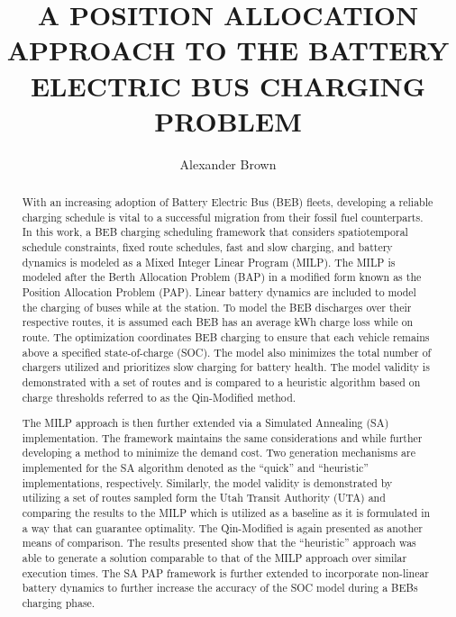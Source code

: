 \documentclass[ee,thesis]{usuthesis}
\author{Alexander Brown}
\date{}
\title{A POSITION ALLOCATION APPROACH TO THE BATTERY ELECTRIC BUS CHARGING PROBLEM}
\begin{document}
\newtheorem*{lemma}{Lemma}

\let\ref\autoref                            %

\preliminaries   %

\maketitle

\tableofcontents
\listoftables
\listoffigures

\begin{abstract}

With an increasing adoption of Battery Electric Bus (BEB) fleets, developing a reliable charging schedule is vital to a successful migration from their fossil fuel counterparts. In this work, a BEB charging scheduling framework that considers spatiotemporal schedule constraints, fixed route schedules, fast and slow charging, and battery dynamics is modeled as a Mixed Integer Linear Program (MILP). The MILP is modeled after the Berth Allocation Problem (BAP) in a modified form known as the Position Allocation Problem (PAP). Linear battery dynamics are included to model the charging of buses while at the station. To model the BEB discharges over their respective routes, it is assumed each BEB has an average kWh charge loss while on route. The optimization coordinates BEB charging to ensure that each vehicle remains above a specified state-of-charge (SOC). The model also minimizes the total number of chargers utilized and prioritizes slow charging for battery health. The model validity is demonstrated with a set of routes and is compared to a heuristic algorithm based on charge thresholds referred to as the Qin-Modified method.

The MILP approach is then further extended via a Simulated Annealing (SA) implementation. The framework maintains the same considerations and while further developing a method to minimize the demand cost. Two generation mechanisms are implemented for the SA algorithm denoted as the ``quick'' and ``heuristic'' implementations, respectively. Similarly, the model validity is demonstrated by utilizing a set of routes sampled form the Utah Transit Authority (UTA) and comparing the results to the MILP which is utilized as a baseline as it is formulated in a way that can guarantee optimality. The Qin-Modified is again presented as another means of comparison. The results presented show that the ``heuristic'' approach was able to generate a solution comparable to that of the MILP approach over similar execution times. The SA PAP framework is further extended to incorporate non-linear battery dynamics to further increase the accuracy of the SOC model during a BEBs charging phase.
\end{abstract}
\end{document}
